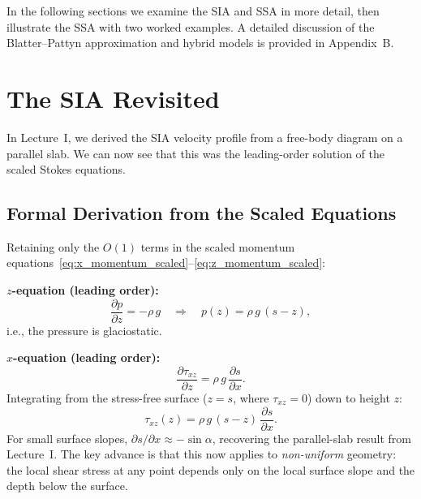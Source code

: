 \documentclass[11pt]{article}
\begin{document}

\noindent In the following sections we examine the SIA and SSA in more detail, then illustrate the SSA with two worked examples.  A detailed discussion of the Blatter--Pattyn approximation and hybrid models is provided in Appendix~B.

\section{The SIA Revisited}

In Lecture~I, we derived the SIA velocity profile from a free-body diagram on a parallel slab.  We can now see that this was the leading-order solution of the scaled Stokes equations.

\subsection{Formal Derivation from the Scaled Equations}

Retaining only the $O(1)$ terms in the scaled momentum equations~\eqref{eq:x_momentum_scaled}--\eqref{eq:z_momentum_scaled}:

\medskip
\noindent\textbf{$z$-equation (leading order):}
\begin{equation}
  \frac{\partial p}{\partial z} = -\rho\,g \quad\Longrightarrow\quad p(z) = \rho\,g\,(s - z),
\end{equation}
i.e., the pressure is glaciostatic.

\medskip
\noindent\textbf{$x$-equation (leading order):}
\begin{equation}
  \frac{\partial \tau_{xz}}{\partial z} = \rho\,g\,\frac{\partial s}{\partial x}.
\end{equation}
Integrating from the stress-free surface ($z = s$, where $\tau_{xz} = 0$) down to height $z$:
\begin{equation}
  \tau_{xz}(z) = \rho\,g\,(s - z)\,\frac{\partial s}{\partial x}.
  \label{eq:sia_stress}
\end{equation}
For small surface slopes, $\partial s/\partial x \approx -\sin\alpha$, recovering the parallel-slab result from Lecture~I.  The key advance is that this now applies to \emph{non-uniform} geometry: the local shear stress at any point depends only on the local surface slope and the depth below the surface.
\end{document}
